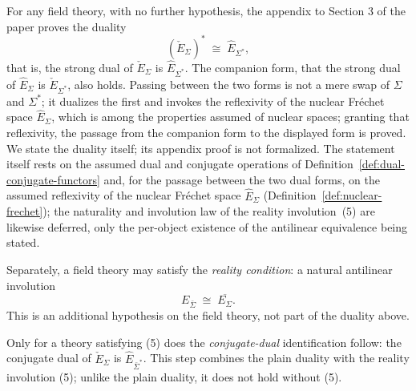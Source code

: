 \begin{definition}
  \label{def:conjugate-dual-duality}
  \notready
  For any field theory, with no further hypothesis, the appendix to Section 3 of
  the paper proves the duality
  \[
    (\check E_{\Sigma})^* \;\cong\; \hat E_{\Sigma^*},
  \]
  that is, the strong dual of $\check E_{\Sigma}$ is $\hat E_{\Sigma^*}$. The
  companion form, that the strong dual of $\hat E_{\Sigma}$ is
  $\check E_{\Sigma^*}$, also holds. Passing between the two forms is not a mere
  swap of $\Sigma$ and $\Sigma^*$; it dualizes the first and invokes the
  reflexivity of the nuclear Fréchet space $\hat E_{\Sigma}$, which is among the
  properties assumed of nuclear spaces; granting that reflexivity, the passage
  from the companion form to the displayed form is proved. We state the duality
  itself; its appendix proof is not formalized. The statement itself rests on
  the assumed dual and conjugate operations of
  Definition~\ref{def:dual-conjugate-functors} and, for the passage between the
  two dual forms, on the assumed reflexivity of the nuclear Fr\'echet space
  $\hat E_\Sigma$ (Definition~\ref{def:nuclear-frechet}); the naturality and
  involution law of the reality involution~(5) are likewise deferred, only the
  per-object existence of the antilinear equivalence being stated.

  Separately, a field theory may satisfy the \emph{reality condition}: a natural
  antilinear involution
  \[
    E_{\bar\Sigma} \;\cong\; \overline{E_{\Sigma}}.
    \tag{5}
  \]
  This is an additional hypothesis on the field theory, not part of the duality
  above.

  Only for a theory satisfying (5) does the \emph{conjugate-dual} identification
  follow: the conjugate dual of $\check E_{\Sigma}$ is $\hat E_{\bar\Sigma^*}$.
  This step combines the plain duality with the reality involution (5); unlike
  the plain duality, it does not hold without (5).
\end{definition}

